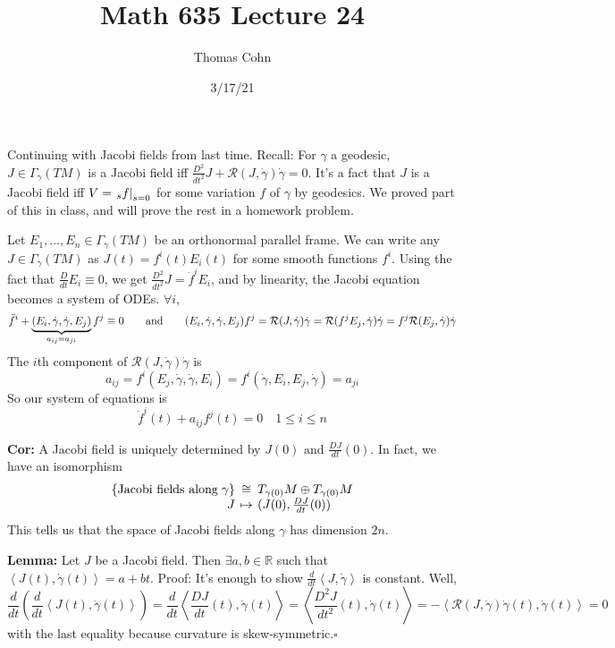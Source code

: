 \documentclass[10pt,letterpaper]{article}
\author{Thomas Cohn}
\title{Math 635 Lecture 24}
\date{3/17/21} %
\newcommand{\n}{\hfill\break}
\newcommand{\nn}{\vspace{0.5\baselineskip}\n}
\newcommand{\hangblock}[2]{\par\noindent\settowidth{\hangindent}{\textbf{#1: }}\textbf{#1: }\nolinebreak#2}
\newcommand{\lemma}[1]{\hangblock{Lemma}{#1}}
\newcommand{\cor}[1]{\hangblock{Cor}{#1}}
\newcommand{\proven}{\;$\square$\n}
\newcommand{\ptxt}[1]{\textrm{\textnormal{#1}}}
\newcommand{\set}[1]{\left\{#1\right\}}
\newcommand{\reals}{\mathbb{R}}
\newcommand{\R}{\reals}
\let\d\relax
\newcommand{\d}{\partial}
\newcommand{\restr}[1]{\left.#1\right|}
\newcommand{\iprod}[1]{\left<#1\right>}
\newcommand{\paren}[1]{\left(#1\right)}
\newcommand{\mc}[1]{\mathcal{#1}}
\begin{document}
\maketitle
\setlength\RaggedRightParindent{\parindent}
\RaggedRight

\par\noindent
Continuing with Jacobi fields from last time. Recall: For $\gamma$ a geodesic, $J\in\Gamma_{\gamma}(TM)$ is a Jacobi field iff $\frac{D^{2}}{dt^{2}}J+\mc{R}(J,\dot\gamma)\dot\gamma=0$. It's a fact that $J$ is a Jacobi field iff $V=\restr{\d_{s}f}_{s=0}$ for some variation $f$ of $\gamma$ by geodesics. We proved part of this in class, and will prove the rest in a homework problem.\n

\par\noindent
Let $E_{1},\ldots,E_{n}\in\Gamma_{\gamma}(TM)$ be an orthonormal parallel frame. We can write any $J\in\Gamma_{\gamma}(TM)$ as $J(t)=f^{i}(t)E_{i}(t)$ for some smooth functions $f^{i}$. Using the fact that $\frac{D}{dt}E_{i}\equiv{}0$, we get $\frac{D^{2}}{dt^{2}}J=\ddot{f}^{i}E_{i}$, and by linearity, the Jacobi equation becomes a system of ODEs. $\forall{}i$,
\[
	\ddot{f}^{i}+\underbrace{(E_{i},\dot\gamma,\dot\gamma,E_{j})}_{a_{ij}=a_{ji}}f^{j}\equiv{}0\qquad\ptxt{and}\qquad(E_{i},\dot\gamma,\dot\gamma,E_{j})f^{j}=\mc{R}(J,\dot\gamma)\dot\gamma=\mc{R}(f^{j}E_{j},\dot\gamma)\dot\gamma=f^{j}\mc{R}(E_{j},\dot\gamma)\dot\gamma
\]
The $i$th component of $\mc{R}(J,\dot\gamma)\dot\gamma$ is
\[
	a_{ij}=f^{i}(E_{j},\dot\gamma,\dot\gamma,E_{i})=f^{i}(\dot\gamma,E_{i},E_{j},\dot\gamma)=a_{ji}
\]
So our system of equations is
\[
	\ddot{f}^{i}(t)+a_{ij}f^{j}(t)=0\quad{}1\le{}i\le{}n
\]

\cor{
	A Jacobi field is uniquely determined by $J(0)$ and $\frac{DJ}{dt}(0)$. In fact, we have an isomorphism
	\[
		\arraycolsep=2pt
		\begin{array}{rcl}
			\set{\ptxt{Jacobi fields along}\;\gamma} & \cong & T_{\gamma(0)}M\oplus{}T_{\gamma(0)}M\\
			J & \mapsto & (J(0),\frac{DJ}{dt}(0))
		\end{array}
	\]
	This tells us that the space of Jacobi fields along $\gamma$ has dimension $2n$.\n
}

\lemma{
	Let $J$ be a Jacobi field. Then $\exists{}a,b\in\R$ such that $\iprod{J(t),\dot\gamma(t)}=a+bt$.\nn
	Proof: It's enough to show $\frac{d}{dt}\iprod{J,\dot\gamma}$ is constant. Well,
	\[
		\frac{d}{dt}\paren{\frac{d}{dt}\iprod{J(t),\dot\gamma(t)}}=\frac{d}{dt}\iprod{\frac{DJ}{dt}(t),\dot\gamma(t)}=\iprod{\frac{D^{2}J}{dt^{2}}(t),\dot\gamma(t)}=-\iprod{\mc{R}(J,\dot\gamma)\dot\gamma(t),\dot\gamma(t)}=0
	\]
	with the last equality because curvature is skew-symmetric.\proven
}
\end{document}
